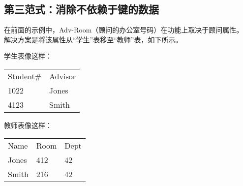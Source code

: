 \subsection{第三范式：消除不依赖于键的数据}
在前面的示例中，Adv-Room（顾问的办公室号码）在功能上取决于顾问属性。 解决方案是将该属性从“学生”表移至“教师”表，如下所示。

学生表像这样：
\begin{table}[h]
    \centering
    \begin{tabular}{ll}
        Student\# & Advisor \\
        1022      & Jones   \\
        4123      & Smith   \\
    \end{tabular}
\end{table}

教师表像这样：
\begin{table}[h]
    \centering
    \begin{tabular}{lll}
        Name  & Room & Dept \\
        Jones & 412  & 42   \\
        Smith & 216  & 42   \\
    \end{tabular}
\end{table}